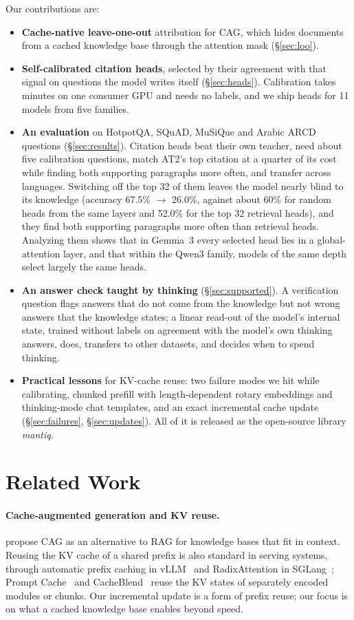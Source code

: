 \documentclass[11pt]{article}
\begin{document}
Our contributions are:
\begin{itemize}
\item \textbf{Cache-native leave-one-out} attribution for CAG, which hides documents from a cached knowledge base through the attention mask (\S\ref{sec:loo}).
\item \textbf{Self-calibrated citation heads}, selected by their agreement with that signal on questions the model writes itself (\S\ref{sec:heads}). Calibration takes minutes on one consumer GPU and needs no labels, and we ship heads for 11 models from five families.
\item \textbf{An evaluation} on HotpotQA, SQuAD, MuSiQue and Arabic ARCD questions (\S\ref{sec:results}). Citation heads beat their own teacher, need about five calibration questions, match AT2's top citation at a quarter of its cost while finding both supporting paragraphs more often, and transfer across languages. Switching off the top 32 of them leaves the model nearly blind to its knowledge (accuracy 67.5\% $\to$ 26.0\%, against about 60\% for random heads from the same layers and 52.0\% for the top 32 retrieval heads), and they find both supporting paragraphs more often than retrieval heads. Analyzing them shows that in Gemma~3 every selected head lies in a global-attention layer, and that within the Qwen3 family, models of the same depth select largely the same heads.
\item \textbf{An answer check taught by thinking} (\S\ref{sec:supported}). A verification question flags answers that do not come from the knowledge but not wrong answers that the knowledge states; a linear read-out of the model's internal state, trained without labels on agreement with the model's own thinking answers, does, transfers to other datasets, and decides when to spend thinking.
\item \textbf{Practical lessons} for KV-cache reuse: two failure modes we hit while calibrating, chunked prefill with length-dependent rotary embeddings and thinking-mode chat templates, and an exact incremental cache update (\S\ref{sec:failures}, \S\ref{sec:updates}). All of it is released as the open-source library \emph{mantiq}.
\end{itemize}

\section{Related Work}
\label{sec:related}

\paragraph{Cache-augmented generation and KV reuse.} \citet{chan2024dontdorag} propose CAG as an alternative to RAG for knowledge bases that fit in context. Reusing the KV cache of a shared prefix is also standard in serving systems, through automatic prefix caching in vLLM~\citep{kwon2023vllm} and RadixAttention in SGLang~\citep{zheng2024sglang}; Prompt Cache~\citep{gim2024promptcache} and CacheBlend~\citep{yao2025cacheblend} reuse the KV states of separately encoded modules or chunks. Our incremental update is a form of prefix reuse; our focus is on what a cached knowledge base enables beyond speed.
\end{document}
